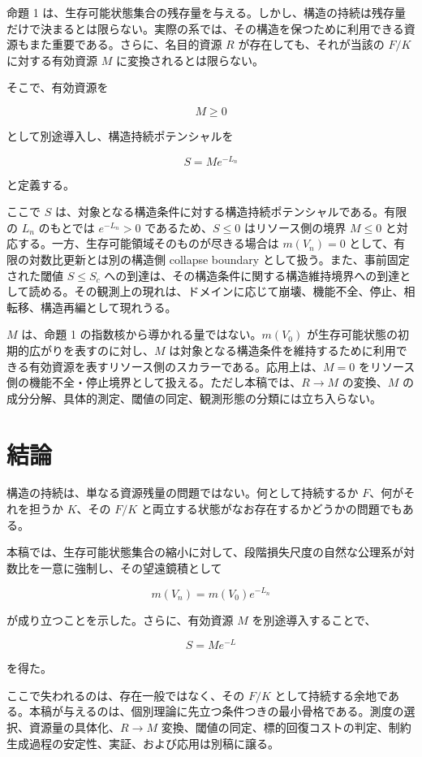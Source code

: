 \documentclass[12pt,a4paper]{article}
\begin{document}
命題 1 は、生存可能状態集合の残存量を与える。しかし、構造の持続は残存量だけで決まるとは限らない。実際の系では、その構造を保つために利用できる資源もまた重要である。さらに、名目的資源 \(R\) が存在しても、それが当該の \(F/K\) に対する有効資源 \(M\) に変換されるとは限らない。

そこで、有効資源を

\[
M\ge 0
\]

として別途導入し、構造持続ポテンシャルを

\[
S = M e^{-L_{n}}
\]

と定義する。

ここで \(S\) は、対象となる構造条件に対する構造持続ポテンシャルである。有限の \(L_n\) のもとでは \(e^{-L_n}>0\) であるため、\(S\le0\) はリソース側の境界 \(M\le0\) と対応する。一方、生存可能領域そのものが尽きる場合は \(m(V_n)=0\) として、有限の対数比更新とは別の構造側 collapse boundary として扱う。また、事前固定された閾値 \(S\le S_{c}\) への到達は、その構造条件に関する構造維持境界への到達として読める。その観測上の現れは、ドメインに応じて崩壊、機能不全、停止、相転移、構造再編として現れうる。

\(M\) は、命題 1 の指数核から導かれる量ではない。\(m(V_0)\) が生存可能状態の初期的広がりを表すのに対し、\(M\) は対象となる構造条件を維持するために利用できる有効資源を表すリソース側のスカラーである。応用上は、\(M=0\) をリソース側の機能不全・停止境界として扱える。ただし本稿では、\(R\to M\) の変換、\(M\) の成分分解、具体的測定、閾値の同定、観測形態の分類には立ち入らない。

\section{結論}\label{ux7d50ux8ad6}

構造の持続は、単なる資源残量の問題ではない。何として持続するか \(F\)、何がそれを担うか \(K\)、その \(F/K\) と両立する状態がなお存在するかどうかの問題でもある。

本稿では、生存可能状態集合の縮小に対して、段階損失尺度の自然な公理系が対数比を一意に強制し、その望遠鏡積として

\[
m(V_{n}) = m(V_0) e^{-L_{n}}
\]

が成り立つことを示した。さらに、有効資源 \(M\) を別途導入することで、

\[
S = M e^{-L}
\]

を得た。

ここで失われるのは、存在一般ではなく、その \(F/K\) として持続する余地である。本稿が与えるのは、個別理論に先立つ条件つきの最小骨格である。測度の選択、資源量の具体化、\(R\to M\) 変換、閾値の同定、標的回復コストの判定、制約生成過程の安定性、実証、および応用は別稿に譲る。
\end{document}
